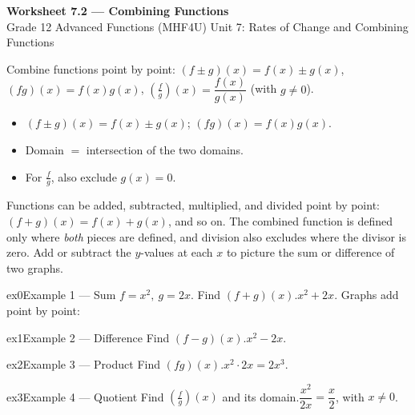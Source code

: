 \documentclass[11pt]{article}
\begin{document}
\begin{center}
{\LARGE\bfseries\color{titleblue}Worksheet 7.2 --- Combining Functions}\\[2pt]
{\small Grade 12 Advanced Functions (MHF4U) \textperiodcentered{} Unit 7: Rates of Change and Combining Functions}
\end{center}

\begin{ideabox}
Combine functions point by point: $(f\pm g)(x)=f(x)\pm g(x)$, $(fg)(x)=f(x)g(x)$, $\left(\tfrac fg\right)(x)=\dfrac{f(x)}{g(x)}$ (with $g\ne0$).
\begin{itemize}[leftmargin=*,itemsep=2pt]
  \item $(f\pm g)(x)=f(x)\pm g(x)$; $(fg)(x)=f(x)g(x)$.
  \item Domain $=$ intersection of the two domains.
  \item For $\tfrac fg$, also exclude $g(x)=0$.
\end{itemize}
\end{ideabox}

\begin{learnbox}
Functions can be added, subtracted, multiplied, and divided point by point: $(f+g)(x)=f(x)+g(x)$, and so on.
The combined function is defined only where \emph{both} pieces are defined, and division also excludes where the divisor is zero.
Add or subtract the $y$-values at each $x$ to picture the sum or difference of two graphs.
\end{learnbox}


\begin{example}{ex0}{Example 1 --- Sum}
$f=x^2,\ g=2x$. Find $(f+g)(x)$.\soln $x^2+2x$. Graphs add point by point:
\end{example}

\begin{example}{ex1}{Example 2 --- Difference}
Find $(f-g)(x)$.\soln $x^2-2x$.
\end{example}

\begin{example}{ex2}{Example 3 --- Product}
Find $(fg)(x)$.\soln $x^2\cdot2x=2x^3$.
\end{example}

\begin{example}{ex3}{Example 4 --- Quotient}
Find $\left(\tfrac fg\right)(x)$ and its domain.\soln $\dfrac{x^2}{2x}=\dfrac x2$, with $x\ne0$.
\end{example}
\end{document}
